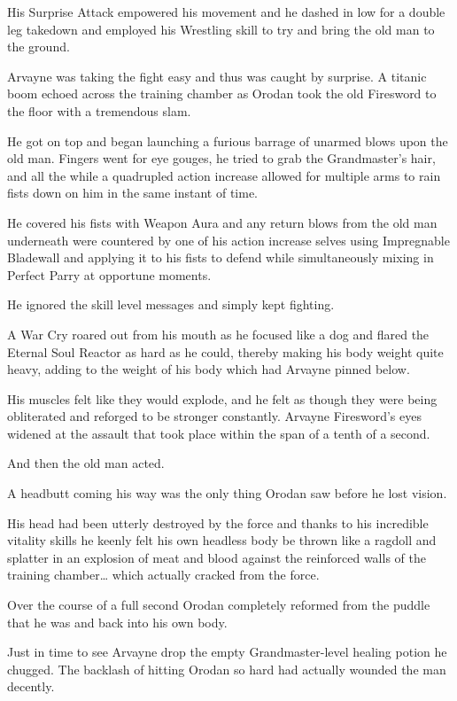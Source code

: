 \documentclass[a4paper,10pt]{book}
\begin{document}
His Surprise Attack empowered his movement and he dashed in low for a double leg takedown and employed his Wrestling skill to try and bring the old man to the ground.\par
Arvayne was taking the fight easy and thus was caught by surprise. A titanic boom echoed across the training chamber as Orodan took the old Firesword to the floor with a tremendous slam.\par
He got on top and began launching a furious barrage of unarmed blows upon the old man. Fingers went for eye gouges, he tried to grab the Grandmaster’s hair, and all the while a quadrupled action increase allowed for multiple arms to rain fists down on him in the same instant of time.\par
He covered his fists with Weapon Aura and any return blows from the old man underneath were countered by one of his action increase selves using Impregnable Bladewall and applying it to his fists to defend while simultaneously mixing in Perfect Parry at opportune moments.\par
He ignored the skill level messages and simply kept fighting.\par
A War Cry roared out from his mouth as he focused like a dog and flared the Eternal Soul Reactor as hard as he could, thereby making his body weight quite heavy, adding to the weight of his body which had Arvayne pinned below.\par
His muscles felt like they would explode, and he felt as though they were being obliterated and reforged to be stronger constantly. Arvayne Firesword’s eyes widened at the assault that took place within the span of a tenth of a second.\par
And then the old man acted.\par
A headbutt coming his way was the only thing Orodan saw before he lost vision.\par
His head had been utterly destroyed by the force and thanks to his incredible vitality skills he keenly felt his own headless body be thrown like a ragdoll and splatter in an explosion of meat and blood against the reinforced walls of the training chamber… which actually cracked from the force.\par
Over the course of a full second Orodan completely reformed from the puddle that he was and back into his own body.\par
Just in time to see Arvayne drop the empty Grandmaster-level healing potion he chugged. The backlash of hitting Orodan so hard had actually wounded the man decently.\par
\end{document}
